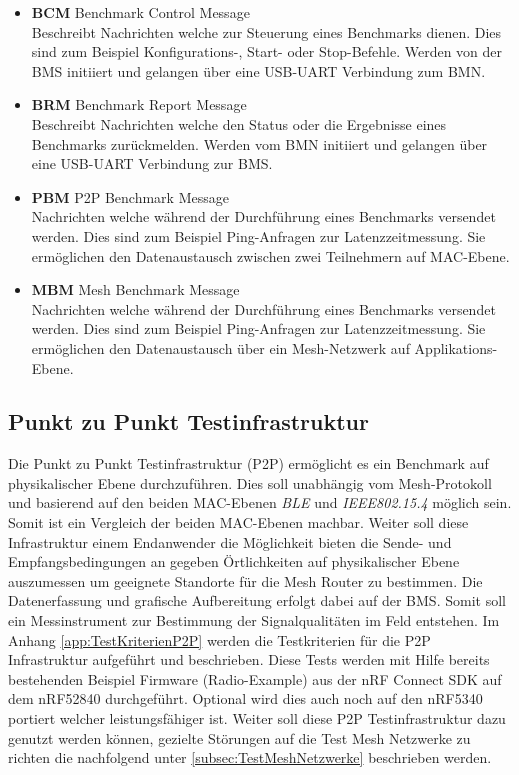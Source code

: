 \begin{itemize}
	\item \textbf{BCM} Benchmark Control Message \\ 
	Beschreibt Nachrichten welche zur Steuerung eines Benchmarks dienen. Dies sind zum Beispiel Konfigurations-, Start- oder Stop-Befehle. Werden von der BMS initiiert und gelangen über eine USB-UART Verbindung zum BMN. 
	\item \textbf{BRM} Benchmark Report Message \\ 
	Beschreibt Nachrichten welche den Status oder die Ergebnisse eines Benchmarks zurückmelden. Werden vom BMN initiiert und gelangen über eine USB-UART Verbindung zur BMS.
	\item \textbf{PBM} P2P Benchmark Message \\ 
	Nachrichten welche während der Durchführung eines Benchmarks versendet werden. Dies sind zum Beispiel Ping-Anfragen zur Latenzzeitmessung. Sie ermöglichen den Datenaustausch zwischen zwei Teilnehmern auf MAC-Ebene. 
	\item \textbf{MBM} Mesh Benchmark Message \\ 
	Nachrichten welche während der Durchführung eines Benchmarks versendet werden. Dies sind zum Beispiel Ping-Anfragen zur Latenzzeitmessung. Sie ermöglichen den Datenaustausch über ein Mesh-Netzwerk auf Applikations-Ebene. 
\end{itemize}

\subsection{Punkt zu Punkt Testinfrastruktur}\label{subsec:PunktzuPunktTestinfrastruktur}

Die Punkt zu Punkt Testinfrastruktur (P2P) ermöglicht es ein Benchmark auf physikalischer Ebene durchzuführen. Dies soll unabhängig vom Mesh-Protokoll und basierend auf den beiden MAC-Ebenen \textit{BLE} und \textit{IEEE802.15.4} möglich sein. Somit ist ein Vergleich der beiden MAC-Ebenen machbar. Weiter soll diese Infrastruktur einem Endanwender die Möglichkeit bieten die Sende- und Empfangsbedingungen an gegeben Örtlichkeiten auf physikalischer Ebene auszumessen um geeignete Standorte für die Mesh Router zu bestimmen. Die Datenerfassung und grafische Aufbereitung erfolgt dabei auf der BMS. Somit soll ein Messinstrument zur Bestimmung der Signalqualitäten im Feld entstehen.
Im Anhang \ref{app:TestKriterienP2P} werden die Testkriterien für die P2P Infrastruktur aufgeführt und beschrieben. Diese Tests werden mit Hilfe bereits bestehenden Beispiel Firmware (Radio-Example) aus der nRF Connect SDK auf dem nRF52840 durchgeführt. Optional wird dies auch noch auf den nRF5340 portiert welcher leistungsfähiger ist.
Weiter soll diese P2P Testinfrastruktur dazu genutzt werden können, gezielte Störungen auf die Test Mesh Netzwerke zu richten die nachfolgend unter \ref{subsec:TestMeshNetzwerke} beschrieben werden.


